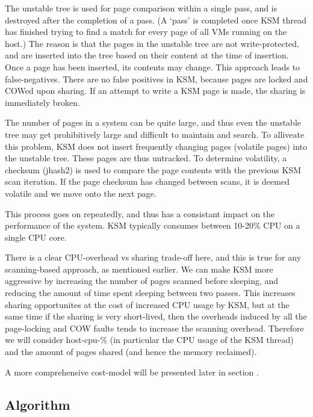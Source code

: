 \documentclass[10pt,a4paper]{article}
\begin{document}
The unstable tree is used for page comparison within a single pass, and is destroyed after the completion of a pass. (A `pass' is completed once KSM thread has finished trying to find a match for every page of all VMs running on the host.) The reason is that the pages in the unstable tree are not write-protected, and are inserted into the tree based on their content at the time of insertion. Once a page has been inserted, its contents may change. This approach leads to false-negatives. There are no false positives in KSM, because pages are locked and COWed upon sharing. If an attempt to write a KSM page is made, the sharing is immediately broken.

The number of pages in a system can be quite large, and thus even the unstable tree may get prohibitively large and difficult to maintain and search. To alliveate this problem, KSM does not insert frequently changing pages (volatile pages) into the unstable tree. These pages are thus untracked.
To determine volatility, a checksum (jhash2) is used to compare the page contents with the previous KSM scan iteration. If the page checksum has changed between scans, it is deemed volatile and we move onto the next page.

This process goes on repeatedly, and thus has a consistant impact on the performance of the system. KSM typically consumes between 10-20\% CPU on a single CPU core. 

There is a clear CPU-overhead vs sharing trade-off here, and this is true for any scanning-based approach, as mentioned earlier. We can make KSM more aggressive by increasing the number of pages scanned before sleeping, and reducing the amount of time spent sleeping between two passes. This increases sharing opportunites at the cost of increased CPU usage by KSM, but at the same time if the sharing is very short-lived, then the overheads induced by all the page-locking and COW faults tends to increase the scanning overhead. 
Therefore we will consider host-cpu-\% (in particular the CPU usage of the KSM thread) and the amount of pages shared (and hence the memory reclaimed).

A more comprehensive cost-model will be presented later in section . 

\subsection{Algorithm}
\end{document}
